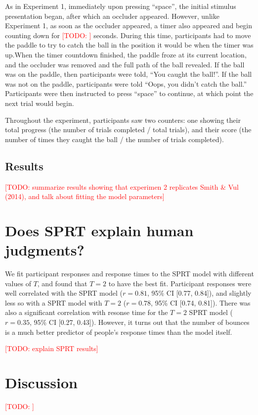 \documentclass[10pt,letterpaper]{article}
\newcommand{\TODO}[1]{\textcolor{red}{[TODO: #1]}}
\begin{document}
As in Experiment 1, immediately upon pressing ``space'', the initial stimulus presentation began, after which an occluder appeared. However, unlike Experiment 1, as soon as the occluder appeared, a timer also appeared and begin counting down for \TODO{} seconds. During this time, participants had to move the paddle to try to catch the ball in the position it would be when the timer was up.When the timer countdown finished, the paddle froze at its current location, and the occluder was removed and the full path of the ball revealed. If the ball was on the paddle, then participants were told, ``You caught the ball!''. If the ball was not on the paddle, participants were told ``Oops, you didn't catch the ball.'' Participants were then instructed to press ``space'' to continue, at which point the next trial would begin.

Throughout the experiment, participants saw two counters: one showing their total progress (the number of trials completed / total trials), and their score (the number of times they caught the ball / the number of trials completed).

\subsection{Results}

\TODO{summarize results showing that experimen 2 replicates Smith \& Vul (2014), and talk about fitting the model parameters}

\section{Does SPRT explain human judgments?}

We fit participant responses and response times to the SPRT model with different values of $T$, and found that $T=2$ to have the best fit. Participant responses were well correlated with the SPRT model ($r=0.81$, 95\% CI [0.77, 0.84]), and slightly less so with a SPRT model with $T=2$ ($r=0.78$, 95\% CI [0.74, 0.81]). There was also a significant correlation with resonse time for the $T=2$ SPRT model ($r=0.35$, 95\% CI [0.27, 0.43]). However, it turns out that the number of bounces is a much better predictor of people's response times than the model itself. 

\TODO{explain SPRT results}



\section{Discussion}

\TODO{}



\setlength{\bibleftmargin}{.125in}
\setlength{\bibindent}{-\bibleftmargin}


\end{document}
